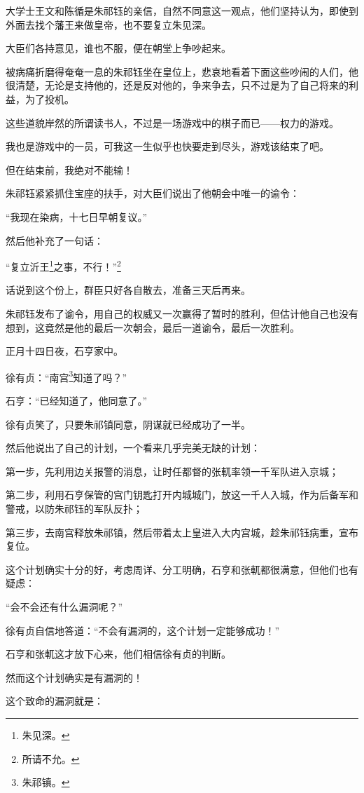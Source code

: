 \begin{multicols}{\theparacolNo}
大学士王文和陈循是朱祁钰的亲信，自然不同意这一观点，他们坚持认为，即使到外面去找个藩王来做皇帝，也不要复立朱见深。

大臣们各持意见，谁也不服，便在朝堂上争吵起来。

被病痛折磨得奄奄一息的朱祁钰坐在皇位上，悲哀地看着下面这些吵闹的人们，他很清楚，无论是支持他的，还是反对他的，争来争去，只不过是为了自己将来的利益，为了投机。

这些道貌岸然的所谓读书人，不过是一场游戏中的棋子而已——权力的游戏。

我也是游戏中的一员，可我这一生似乎也快要走到尽头，游戏该结束了吧。

但在结束前，我绝对不能输！

朱祁钰紧紧抓住宝座的扶手，对大臣们说出了他朝会中唯一的谕令：

“我现在染病，十七日早朝复议。”

然后他补充了一句话：

“复立沂王\footnote{朱见深。}之事，不行！”\footnote{所请不允。}

话说到这个份上，群臣只好各自散去，准备三天后再来。

朱祁钰发布了谕令，用自己的权威又一次赢得了暂时的胜利，但估计他自己也没有想到，这竟然是他的最后一次朝会，最后一道谕令，最后一次胜利。

正月十四日夜，石亨家中。

徐有贞：“南宫\footnote{朱祁镇。}知道了吗？”

石亨：“已经知道了，他同意了。”

徐有贞笑了，只要朱祁镇同意，阴谋就已经成功了一半。

然后他说出了自己的计划，一个看来几乎完美无缺的计划：

第一步，先利用边关报警的消息，让时任都督的张軏率领一千军队进入京城；

第二步，利用石亨保管的宫门钥匙打开内城城门，放这一千人入城，作为后备军和警戒，以防朱祁钰的军队反扑；

第三步，去南宫释放朱祁镇，然后带着太上皇进入大内宫城，趁朱祁钰病重，宣布复位。

这个计划确实十分的好，考虑周详、分工明确，石亨和张軏都很满意，但他们也有疑虑：

“会不会还有什么漏洞呢？”

徐有贞自信地答道：“不会有漏洞的，这个计划一定能够成功！”

石亨和张軏这才放下心来，他们相信徐有贞的判断。

然而这个计划确实是有漏洞的！

这个致命的漏洞就是：


\end{multicols}
